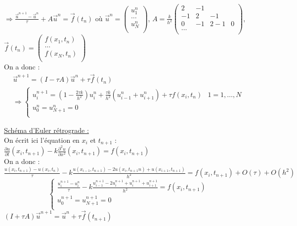 \documentclass[../main.tex]{subfiles}
\begin{document}
$\Rightarrow \frac{\Vec{u}^{n+1}-\Vec{u}^n}{\tau}+A \Vec{u}^n = \Vec{f}(t_n)$ où $\Vec{u}^n = \begin{pmatrix}
    u_1^n\\
    \dots\\
    u_N^n\\
\end{pmatrix}$, $A = \frac{k}{h^2} \begin{pmatrix}
    2 & -1 &\\
    -1 & 2 & -1\\
    0 & -1 &2 -1 & 0\\
    \dots\\
\end{pmatrix}$, $\Vec{f}(t_n) = \begin{pmatrix}
    f(x_1,t_n)\\
    \dots \\
    f(x_N,t_n)\\
\end{pmatrix}$\\

On a donc : \begin{equation}
\begin{gathered}
    \Vec{u}^{n+1} = (I-\tau A) \Vec{u}^n + \tau \Vec{f}(t_n)\\
    \Rightarrow \begin{cases}
        u_i^{n+1} = (1-\frac{2\tau k}{h^2})u_i^n + \frac{\tau k}{h^2} (u_{i-1}^n+u_{i+1}^n)+\tau f(x_i,t_n) & 1=1,\dots, N\\
        u_0^n = u_{N+1}^n = 0\\
    \end{cases}
    \end{gathered}
\end{equation}

\quad \underline{Schéma d'Euler rétrograde :}\\
On écrit ici l'équation en $x_i$ et $t_{n+1}$ : $\frac{\partial u}{\partial t}(x_i,t_{n+1})-k\frac{\partial^2 u}{\partial x^2}(x_i,t_{n+1}) = f(x_i,t_{n+1})$\\

On a donc :\\
$\frac{u(x_i,t_{n+1})-u(x_i,t_n)}{\tau} - k\frac{u(x_{i-1},t_{n+1})-2u(x_i,t_{n+1}n)+u(x_{i+1},t_{n+1})}{h^2} = f(x_i,t_{n+1})+O(\tau)+O(h^2)$\\

\begin{equation}
    \begin{cases}
        \frac{u_i^{n+1}-u_i^n}{\tau}-k \frac{u_{i-1}^{n+1}-2u_i^{n+1}+u_i^{n+1}+u_{i+1}^{n+1}}{h^2} = f(x_i,t_{n+1})\\ 
        u_0^{n+1} = u_{N+1}^{n+1} = 0\\
    \end{cases}
\end{equation}
$(I+\tau A) \Vec{u}^{n+1} = \Vec{u}^n + \tau \Vec{f}(t_{n+1})$\\
\end{document}
